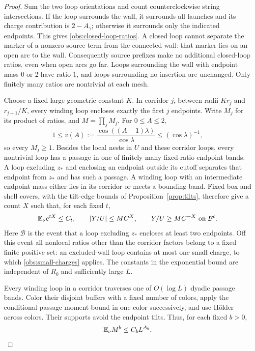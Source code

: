 \begin{proof}
Sum the two loop orientations and count counterclockwise string
intersections.  If the loop surrounds the wall, it surrounds all
launches and its charge contribution is $2-A_\gamma$; otherwise
it surrounds only the indicated endpoints.  This gives
\eqref{obs:closed-loop-ratios}.  A closed loop cannot separate the
marker of a nonzero source term from the connected wall: that
marker lies on an open arc to the wall.  Consequently source
prefixes make no additional closed-loop ratios, even when open
arcs go far.  Loops surrounding the wall with endpoint mass $0$
or $2$ have ratio $1$, and loops surrounding no insertion are
unchanged.  Only finitely many ratios are nontrivial at each mesh.

Choose a fixed large geometric constant $K$.  In corridor $j$,
between radii $Kr_j$ and $r_{j+1}/K$, every winding loop encloses
exactly the first $j$ endpoints.  Write $M_j$ for its product of
ratios, and $M=\prod_jM_j$.  For $0\le A\le2$,
\[
 1\le v(A):=\frac{\cos((A-1)\lambda)}{\cos\lambda}
       \le(\cos\lambda)^{-1},
\]
so every $M_j\ge1$.  Besides the local nests in $U$ and these
corridor loops, every nontrivial loop has a passage in one of
finitely many fixed-ratio endpoint bands.  A loop excluding $z_*$
and enclosing an endpoint outside its cutoff separates that
endpoint from $z_*$ and has such a passage.  A winding loop with
an intermediate endpoint mass either lies in its corridor or
meets a bounding band.  Fixed box and shell covers, with the
tilt-edge bounds of Proposition~\ref{prop:tilts}, therefore give
a count $X$ such that, for each fixed $t$,
\begin{equation}
 \mathbb E_\nu e^{tX}\le C_t,
 \qquad |Y/U|\le MC^X,
 \qquad Y/U\ge MC^{-X}\ \text{on }\mathcal B^c.
 \label{obs:distant-sandwich}
\end{equation}
Here $\mathcal B$ is the event that a loop excluding $z_*$ encloses
at least two endpoints.  Off this event all nonlocal ratios other
than the corridor factors belong to a fixed finite positive set:
an excluded-wall loop contains at most one small charge, to which
\eqref{obs:small-charges} applies.  The constants in the exponential
bound are independent of $R_0$ and sufficiently large $L$.

Every winding loop in a corridor traverses one of $O(\log L)$
dyadic passage bands.  Color their disjoint buffers with a fixed
number of colors, apply the conditional passage moment bound in
one color successively, and use H\"older across colors.  Their
supports avoid the endpoint tilts.  Thus, for each fixed $b>0$,
\begin{equation}
 \mathbb E_\nu M^b\le C_bL^{A_b}.
 \label{obs:corridor-moments}
\end{equation}


\end{proof}
